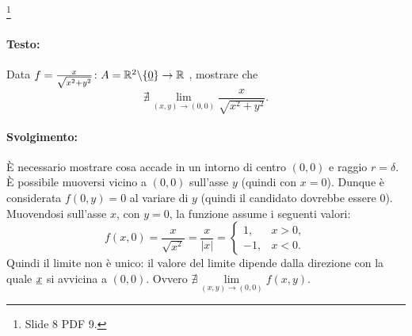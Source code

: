 \begin{example}\footnote{Slide 8 PDF 9.}
    \paragraph{Testo:} Data $f=\frac{x}{\sqrt{x^2+y^2}}\colon A=\mathbb R^2\backslash\{\uline 0\}\rightarrow\mathbb R$ , mostrare che 
    \begin{equation*}
       \nexists \lim\limits_{(x,y)\rightarrow(0,0)}\frac{x}{\sqrt{x^2+y^2}}.
    \end{equation*}
    \paragraph{Svolgimento:} \footnotemark È necessario mostrare cosa accade in un intorno di centro $(0,0)$ e raggio $r=\delta$. È possibile muoversi vicino a $(0,0)$ sull'asse $y$ (quindi con $x=0$). Dunque è considerata $f(0,y)=0$ al variare di $y$ (quindi il candidato dovrebbe essere 0).\\
    Muovendosi sull'asse $x$, con $y=0$, la funzione assume i seguenti valori:
    \begin{equation}\label{eq:esempio_limiti_1}
        f(x,0)=\frac{x}{\sqrt{x^2}}=\frac{x}{|x|}=
        \begin{cases}
            1, & x>0,\\
            -1,& x<0.
        \end{cases}
    \end{equation}
    Quindi il limite non è unico: il valore del limite dipende dalla direzione con la quale $\uline x$ si avvicina a $(0,0)$. Ovvero $\nexists\lim\limits_{(x,y)\rightarrow(0,0)}f(x,y)$.

    \begin{figure}
    \centering
\end{figure}
\end{example}
